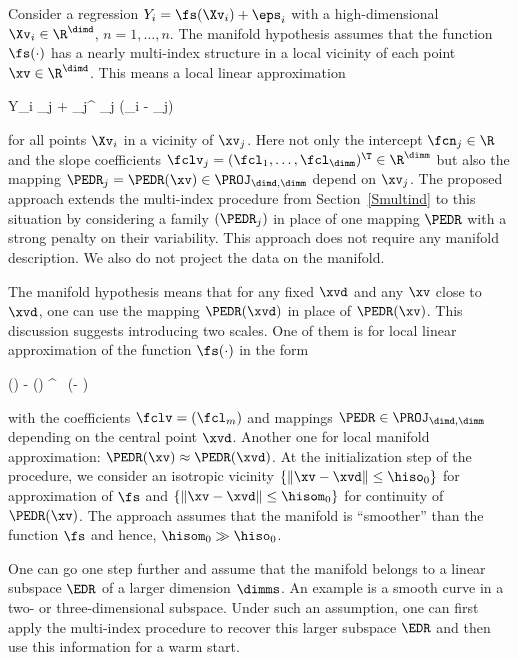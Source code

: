 Consider a regression \( Y_{i} = \fs(\Xv_{i}) + \eps_{i} \) with a high-dimensional \( \Xv_{i} \in \R^{\dimd} \),
\( n = 1,\ldots,n \).
The manifold hypothesis assumes that the function \( \fs(\cdot) \) has a nearly multi-index structure in a local vicinity 
of each point \( \xv \in \R^{\dimd} \).
This means a local linear approximation
\begin{EQA}[c]
	\E Y_{i}
	\approx
	\fcn_{j} + \fclv_{j}^{\T} \PEDR_{j} (\Xv_{i} - \xv_{j})
\end{EQA}
for all points \( \Xv_{i} \) in a vicinity of \( \xv_{j} \).
Here not only the intercept \( \fcn_{j} \in \R \) and 
the slope coefficients \( \fclv_{j} = (\fcl_{1},\ldots,\fcl_{\dimm})^{\T} \in \R^{\dimm} \)
but also the mapping \( \PEDR_{j} = \PEDR(\xv) \in \PROJ_{\dimd,\dimm} \)
depend on \( \xv_{j} \).
%
The proposed approach extends the multi-index procedure from Section~\ref{Smultind} to this situation 
by considering a family \( (\PEDR_{j}) \) in place of one mapping \( \PEDR \) with a strong penalty on their variability.
This approach does not require any manifold description.
We also do not project the data on the manifold.

The manifold hypothesis means that for any fixed \( \xvd \) and any \( \xv \) close to \( \xvd \), 
one can use the mapping \( \PEDR(\xvd) \) in place of \( \PEDR(\xv) \). 
%
This discussion suggests introducing two scales.
One of them is for local linear approximation of the function \( \fs(\cdot) \) in the form
\begin{EQA}[c]
	\fs(\xv) - \fs(\xvd)
	\approx
	\fclv^{\T} \, \PEDR (\xv - \xvd) 
\end{EQA} 
with the coefficients \( \fclv = (\fcl_{m}) \) and mappings \( \PEDR \in \PROJ_{\dimd,\dimm} \) depending
on the central point \( \xvd \).
Another one for local manifold approximation:  
\(
	\PEDR(\xv)
	\approx
	\PEDR(\xvd)
\).
At the initialization step of the procedure, we consider an isotropic vicinity
\( \{ \| \xv - \xvd \| \leq \hiso_{0} \} \) for approximation of \( \fs \)
and \( \{ \| \xv - \xvd \| \leq \hisom_{0} \} \) for continuity of \( \PEDR(\xv) \).
The approach assumes that the manifold is ``smoother'' than the function \( \fs \) and hence,
\( \hisom_{0} \gg \hiso_{0} \).

One can go one step further and assume that the manifold belongs to a linear subspace \( \EDR \) of a larger dimension \( \dimms \).
An example is a smooth curve in a two- or three-dimensional subspace.
Under such an assumption, one can first apply the multi-index procedure to recover this larger subspace \( \EDR \)
and then use this information for a warm start.

